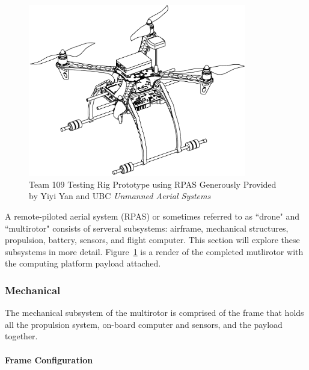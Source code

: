 \begin{figure}[H]
	\centering
	\includegraphics[width=0.85\textwidth]{img/testrigcad1.png}
	\caption[Team 109 Testing Rig Prototype]{Team 109 Testing Rig Prototype using RPAS Generously Provided by Yiyi Yan and UBC \textit{Unmanned Aerial Systems}}
	\label{fig:testrigcad1}
\end{figure}

A remote-piloted aerial system (RPAS) or sometimes referred to as ``drone" and ``multirotor" consists of serveral subsystems: airframe, mechanical structures, propulsion, battery, sensors, and flight computer. This section will explore these subsystems in more detail. Figure~\ref{fig:testrigcad1} is a render of the completed mutlirotor with the computing platform payload attached.

\subsubsection{Mechanical}
The mechanical subsystem of the multirotor is comprised of the frame that holds all the propulsion system, on-board computer and sensors, and the payload together.

\paragraph{Frame Configuration}

